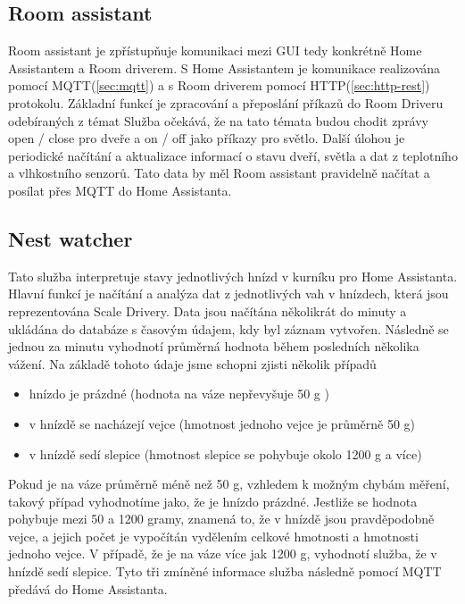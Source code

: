 \subsection{Room assistant}
Room assistant je zpřístupňuje komunikaci mezi GUI tedy konkrétně Home Assistantem a Room driverem.\newline
S Home Assistantem je komunikace realizována pomocí MQTT(\ref{sec:mqtt}) a s Room driverem pomocí HTTP(\ref{sec:http-rest}) protokolu.
Základní funkcí je zpracování a přeposlání příkazů do Room Driveru odebíraných z témat
Služba očekává, že na tato témata budou chodit zprávy open / close pro dveře a on / off jako příkazy pro světlo.
Další úlohou je periodické načítání a aktualizace informací o stavu dveří, světla a dat z teplotního a vlhkostního senzorů.
Tato data by měl Room assistant pravidelně načítat a posílat přes MQTT do Home Assistanta.

\subsection{Nest watcher}
Tato služba interpretuje stavy jednotlivých hnízd v kurníku pro Home Assistanta.
Hlavní funkcí je načítání a analýza dat z jednotlivých vah v hnízdech, která jsou reprezentována Scale Drivery.\newline
Data jsou načítána několikrát do minuty a ukládána do databáze s časovým údajem, kdy byl záznam vytvořen.
Následně se jednou za minutu vyhodnotí průměrná hodnota během posledních několika vážení.
Na základě tohoto údaje jsme schopni zjisti několik případů
\begin{itemize}
    \item hnízdo je prázdné (hodnota na váze nepřevyšuje 50 g )
    \item v hnízdě se nacházejí vejce (hmotnost jednoho vejce je průměrně 50 g)
    \item v hnízdě sedí slepice (hmotnost slepice se pohybuje okolo 1200 g a více)
\end{itemize}
Pokud je na váze průměrně méně než 50 g, vzhledem k možným chybám měření, takový případ vyhodnotíme jako, že je hnízdo prázdné.
Jestliže se hodnota pohybuje mezi 50 a 1200 gramy, znamená to, že v hnízdě jsou pravděpodobně vejce, a jejich počet je vypočítán vydělením celkové hmotnosti a hmotnosti jednoho vejce.
V případě, že je na váze více jak 1200 g, vyhodnotí služba, že v hnízdě sedí slepice.
Tyto tři zmíněné informace služba následně pomocí MQTT předává do Home Assistanta.

